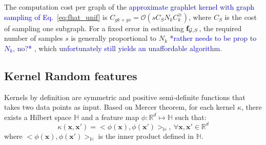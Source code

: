 \documentclass{article}
\newcommand\nt[1]{\textcolor{blue}{#1}}
\begin{document}
The computation cost per graph of the \nt{approximate graphlet kernel with graph sampling of Eq.~\eqref{eq:fhat_unif}} is $C_{gk + gs}= \mathcal{O}\left(s C_S N_k C^{\cong}_k\right)$, where $C_S$ is the cost of sampling one subgraph. %
For a fixed error in estimating $\mathbf{f}_{\mathcal{G},S}$, the required number of samples $s$ is generally proportional to $N_k$ \nt{*rather needs to be prop to $N_k$, no?*} \cite{graphlet_kernel}, which \nt{unfortunately still yields an unaffordable algorithm}.




\iffalse
\subsection{Kernel Random features}\label{sec:Random_features}
Kernels by definition are symmetric and positive  semi-definite functions that takes two data points as input. Based on Mercer theorem, for each kernel $\kappa$, there exists a Hilbert space $\mathbb{H}$ and a  feature map $\phi:\mathbb{R}^d\mapsto\mathbb{H}$ such that:  
	\begin{equation}
	\label{eq:kernel_main_equation}
	\kappa(\mathbf{x},\mathbf{x}')=<\phi(\mathbf{x}),\phi(\mathbf{x}')>_\mathbb{H},~ \forall \mathbf{x},\mathbf{x}'\in\mathbb{R}^d
	\end{equation}
	where $<\phi(\mathbf{x}),\phi(\mathbf{x}')>_\mathbb{H}$ is the inner product defined in $\mathbb{H}$.
\end{document}
